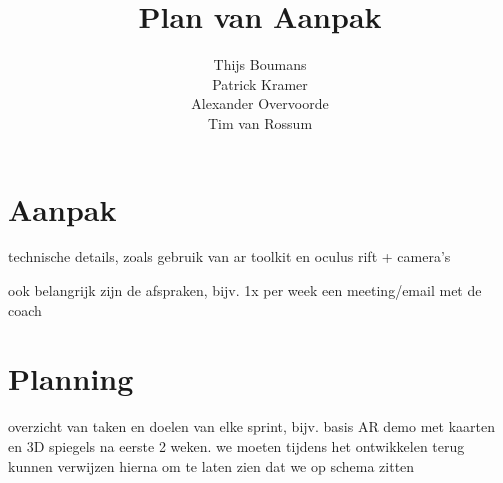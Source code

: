 \documentclass[11pt] {article}
\title{Plan van Aanpak}
\author{Thijs Boumans\\ Patrick Kramer\\ Alexander Overvoorde\\ Tim van Rossum}
\date{}
\begin{document}
\maketitle



\section{Aanpak}

technische details, zoals gebruik van ar toolkit en oculus rift + camera's

ook belangrijk zijn de afspraken, bijv. 1x per week een meeting/email met de coach

\section{Planning}

overzicht van taken en doelen van elke sprint, bijv. basis AR demo met kaarten en 3D spiegels na eerste 2 weken. we moeten tijdens het ontwikkelen terug kunnen verwijzen hierna om te laten zien dat we op schema zitten
\end{document}
